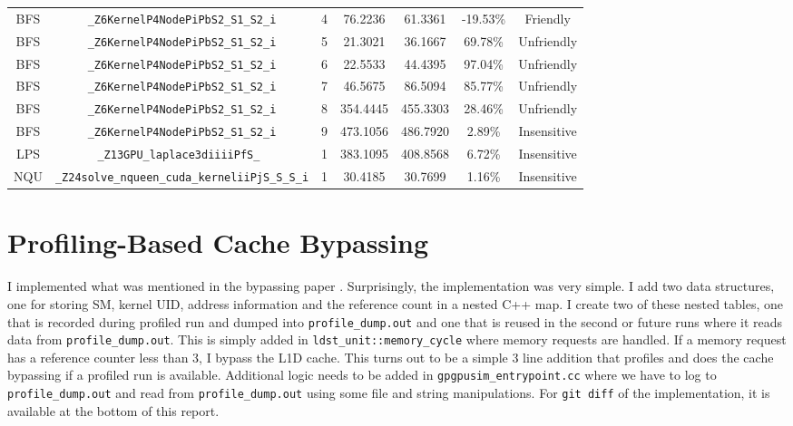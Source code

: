 \documentclass{article}
\begin{document}
\begin{table}[H]
\begin{tabular}{c c c c c c c}
BFS & \verb|_Z6KernelP4NodePiPbS2_S1_S2_i|           & 4  & 76.2236   & 61.3361  & -19.53\% &Friendly\\
BFS & \verb|_Z6KernelP4NodePiPbS2_S1_S2_i|           & 5  & 21.3021   & 36.1667  & 69.78\% &Unfriendly\\
BFS & \verb|_Z6KernelP4NodePiPbS2_S1_S2_i|           & 6  & 22.5533   & 44.4395  & 97.04\% &Unfriendly\\
BFS & \verb|_Z6KernelP4NodePiPbS2_S1_S2_i|           & 7  & 46.5675   & 86.5094  & 85.77\% &Unfriendly\\
BFS & \verb|_Z6KernelP4NodePiPbS2_S1_S2_i|           & 8  & 354.4445  & 455.3303 & 28.46\% &Unfriendly\\
BFS & \verb|_Z6KernelP4NodePiPbS2_S1_S2_i|           & 9  & 473.1056  & 486.7920 & 2.89\% &Insensitive\\
LPS & \verb|_Z13GPU_laplace3diiiiPfS_ |              & 1  & 383.1095  & 408.8568 & 6.72\% &Insensitive\\ 
NQU & \verb|_Z24solve_nqueen_cuda_kerneliiPjS_S_S_i| & 1  & 30.4185   & 30.7699  & 1.16\% &Insensitive\\
[1ex] %
\hline %
\end{tabular}
\label{table:cache} %
\end{table}

\section{Profiling-Based Cache Bypassing}

I implemented what was mentioned in the bypassing paper \cite{cachebypassing}. Surprisingly, the implementation was very simple. I add two data structures, one for storing SM, kernel UID, address information and the reference count in a nested C++ map. I create two of these nested tables, one that is recorded during profiled run and dumped into \verb|profile_dump.out| and one that is reused in the second or future runs where it reads data from \verb|profile_dump.out|. This is simply added in \verb|ldst_unit::memory_cycle| where memory requests are handled. If a memory request has a reference counter less than 3, I bypass the L1D cache. This turns out to be a simple 3 line addition that profiles and does the cache bypassing if a profiled run is available. Additional logic needs to be added in \verb|gpgpusim_entrypoint.cc| where we have to log to \verb|profile_dump.out| and read from \verb|profile_dump.out| using some file and string manipulations. For \verb|git diff| of the implementation, it is available at the bottom of this report. 
\end{document}

